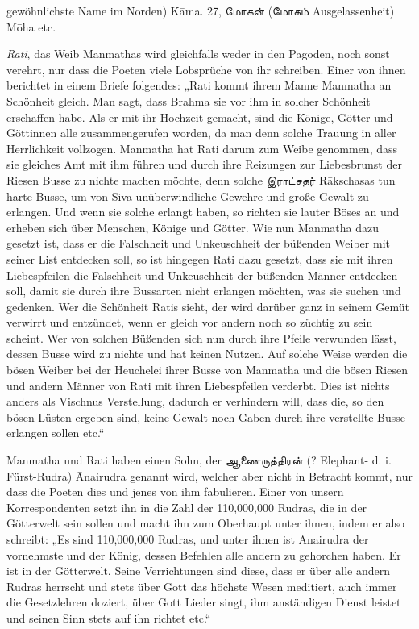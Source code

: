 \documentclass{article}
\newcommand{\TamilText}[1]{\texttamil{#1}}
\newcommand{\tam}[1]{\TamilText{#1}}
\begin{document}
gewöhnlichste Name im Norden) K\={a}ma. 27, \tam{மோகன்} (\tam{மோகம்} Ausgelassenheit) M\={o}ha etc.

\emph{Rati}, das Weib Manmathas wird gleichfalls weder in den Pagoden, noch sonst verehrt, nur dass die Poeten viele Lobsprüche von ihr schreiben. Einer von ihnen berichtet in einem Briefe folgendes: „Rati kommt ihrem Manne Manmatha an Schönheit gleich. Man sagt, dass Brahma sie vor ihm in solcher Schönheit erschaffen habe. Als er mit ihr Hochzeit gemacht, sind die Könige, Götter und Göttinnen alle zusammengerufen worden, da man denn solche Trauung in aller Herrlichkeit vollzogen. Manmatha hat Rati darum zum Weibe genommen, dass sie gleiches Amt mit ihm führen und durch ihre Reizungen zur Liebesbrunst der Riesen Busse zu nichte machen möchte, denn solche \tam{இராட்சதர்} R\={a}kschasas tun harte Busse, um von Siva unüberwindliche Gewehre und große Gewalt zu erlangen. Und wenn sie solche erlangt haben, so richten sie lauter Böses an und erheben sich über Menschen, Könige und Götter. Wie nun Manmatha dazu gesetzt ist, dass er die Falschheit und Unkeuschheit der büßenden Weiber mit seiner List entdecken soll, so ist hingegen Rati dazu gesetzt, dass sie mit ihren Liebespfeilen die Falschheit und Unkeuschheit der büßenden Männer entdecken soll, damit sie durch ihre Bussarten nicht erlangen möchten, was sie suchen und gedenken. Wer die Schönheit Ratis sieht, der wird darüber ganz in seinem Gemüt verwirrt und entzündet, wenn er gleich vor andern noch so züchtig zu sein scheint. Wer von solchen Büßenden sich nun durch ihre Pfeile verwunden lässt, dessen Busse wird zu nichte und hat keinen Nutzen. Auf solche Weise werden die bösen Weiber bei der Heuchelei ihrer Busse von Manmatha und die bösen Riesen und andern Männer von Rati mit ihren Liebespfeilen verderbt. Dies ist nichts anders als Vischnus Verstellung, dadurch er verhindern will, dass die, so den bösen Lüsten ergeben sind, keine Gewalt noch Gaben durch ihre verstellte Busse erlangen sollen etc.“

Manmatha und Rati haben einen Sohn, der \tam{ஆணைருத்திரன்} (? Elephant- d. i. Fürst-Rudra) \={A}nairudra genannt wird, welcher aber nicht in Betracht kommt, nur dass die Poeten dies und jenes von ihm fabulieren. Einer von unsern Korrespondenten setzt ihn in die Zahl der 110,000,000 Rudras, die in der Götterwelt sein sollen und macht ihn zum Oberhaupt unter ihnen, indem er also schreibt: „Es sind 110,000,000 Rudras, und unter ihnen ist Anairudra der vornehmste und der König, dessen Befehlen alle andern zu gehorchen haben. Er ist in der Götterwelt. Seine Verrichtungen sind diese, dass er über alle andern Rudras herrscht und stets über Gott das höchste Wesen meditiert, auch immer die Gesetzlehren doziert, über Gott Lieder singt, ihm anständigen Dienst leistet und seinen Sinn stets auf ihn richtet etc.“
\end{document}
